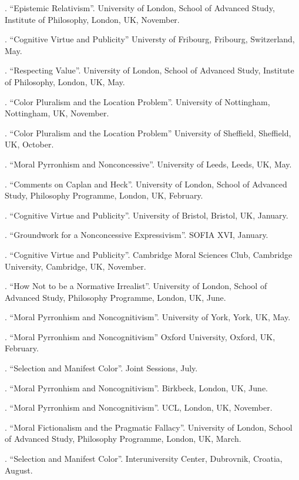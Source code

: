 \documentclass[11pt]{article}
\begin{document}
. ``Epistemic Relativism''. University of London, School of Advanced Study, Institute of Philosophy, London, UK, November.

. ``Cognitive Virtue and Publicity'' Universty of Fribourg, Fribourg, Switzerland, May. 

. ``Respecting Value''. University of London, School of Advanced Study, Institute of Philosophy, London, UK, May.

. ``Color Pluralism and the Location Problem''. University of Nottingham, Nottingham, UK, November.

. ``Color Pluralism and the Location Problem'' University of Sheffield, Sheffield, UK, October.

. ``Moral Pyrronhism and Nonconcessive''. University of Leeds, Leeds, UK, May.

. ``Comments on Caplan and Heck''. University of London, School of Advanced Study, Philosophy Programme, London, UK, February.

. ``Cognitive Virtue and Publicity''. University of Bristol, Bristol, UK, January.

.  ``Groundwork for a Nonconcessive Expressivism''. SOFIA XVI, January.

. ``Cognitive Virtue and Publicity''. Cambridge Moral Sciences Club, Cambridge University, Cambridge, UK, November.

. ``How Not to be a Normative Irrealist''. University of London, School of Advanced Study, Philosophy Programme, London, UK, June.

. ``Moral Pyrronhism and Noncognitivism''. University of York, York, UK, May.

. ``Moral Pyrronhism and Noncognitivism'' Oxford University, Oxford, UK, February.

. ``Selection and Manifest Color''. Joint Sessions, July.

. ``Moral Pyrronhism and Noncognitivism''. Birkbeck, London, UK, June.

. ``Moral Pyrronhism and Noncognitivism''. UCL, London, UK, November.

. ``Moral Fictionalism and the Pragmatic Fallacy''. University of London, School of Advanced Study, Philosophy Programme, London, UK, March.

. ``Selection and Manifest Color''. Interuniversity Center, Dubrovnik, Croatia, August.
\end{document}
